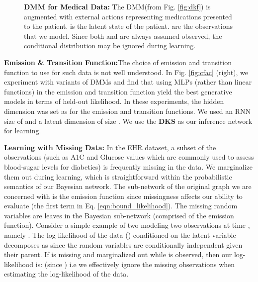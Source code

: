 \documentclass[letterpaper]{article}
\theoremstyle{plain}
\newcommand{\DMM}{DMM\xspace}
\newcommand{\DKS}{\textbf{DKS}\xspace}
\begin{document}
{\begin{figure}[h]
\centering
    \caption{\small \textbf{\DMM for Medical Data: } 
    The \DMM (from Fig. \ref{fig:dkf}) is augmented with external actions  representing medications presented to the patient.  is 
the latent state of the patient.  are the observations that we model.
Since both  and  are always assumed observed, the conditional distribution  
may be ignored during learning.}
\label{fig:dmm_action}
\end{figure}

\textbf{Emission \& Transition Function:}The choice of emission and transition function to use for 
such data is not well understood. In Fig. \ref{fig:cfac} (right), we experiment with variants of 
DMMs and find that using MLPs (rather than linear functions) in the emission and transition function yield the best generative models in terms of held-out likelihood. 
In these experiments, the hidden dimension was set as  for the emission and transition functions.
We used an RNN size of  and a latent dimension of size . We use the \DKS as our inference network for learning.  

\textbf{Learning with Missing Data: }
In the EHR dataset, a subset of the observations (such as A1C and Glucose
values which are commonly used to assess blood-sugar levels for diabetics) is frequently missing in the data. We marginalize them 
out during learning, which is straightforward within the probabilistic semantics of our Bayesian network. 
The sub-network of the original graph we are concerned with is the emission function since missingness affects our ability 
to evaluate  (the first term in Eq. \ref{eqn:bound_likelihood}). 
The missing random variables are leaves in the Bayesian sub-network (comprised of the emission function).  
Consider a simple example of two modeling two observations
at time , namely . The log-likelihood of the data () conditioned 
on the latent variable  decomposes as 
since the random variables are conditionally independent given their parent. 
If  is missing and marginalized out while  is observed, then
our log-likelihood is:  (since ) 
i.e we effectively ignore the missing observations when estimating the log-likelihood of the data. 

}
\end{document}
